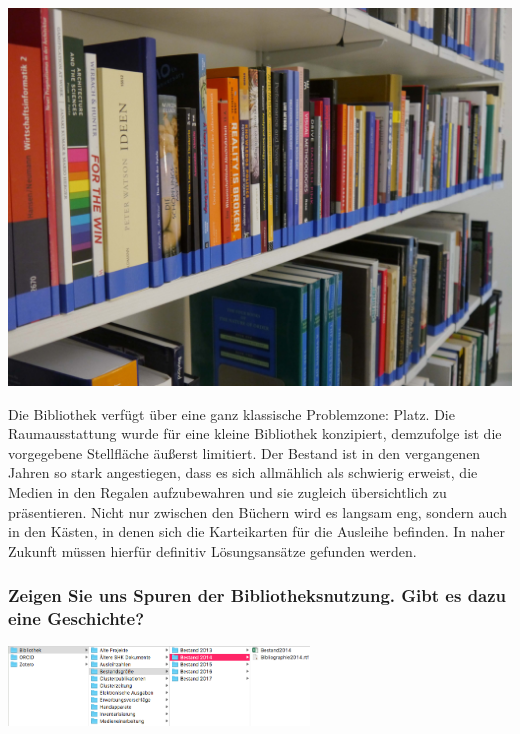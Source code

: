 \begin{center}
\includegraphics{bwg-cluster/img/Platzmangel.jpg}
\end{center}

Die Bibliothek verfügt über eine ganz klassische Problemzone: Platz. Die
Raumausstattung wurde für eine kleine Bibliothek konzipiert, demzufolge
ist die vorgegebene Stellfläche äußerst limitiert. Der Bestand ist in
den vergangenen Jahren so stark angestiegen, dass es sich allmählich als
schwierig erweist, die Medien in den Regalen aufzubewahren und sie
zugleich übersichtlich zu präsentieren. Nicht nur zwischen den Büchern
wird es langsam eng, sondern auch in den Kästen, in denen sich die
Karteikarten für die Ausleihe befinden. In naher Zukunft müssen hierfür
definitiv Lösungsansätze gefunden werden.

\hypertarget{zeigen-sie-uns-spuren-der-bibliotheksnutzung.-gibt-es-dazu-eine-geschichte}{%
\subsubsection{Zeigen Sie uns Spuren der Bibliotheksnutzung. Gibt es dazu eine
Geschichte?}\label{zeigen-sie-uns-spuren-der-bibliotheksnutzung.-gibt-es-dazu-eine-geschichte}}

\begin{center}
\includegraphics[width=0.6\textwidth]{bwg-cluster/img/Ordnerstruktur.png}
\end{center}

